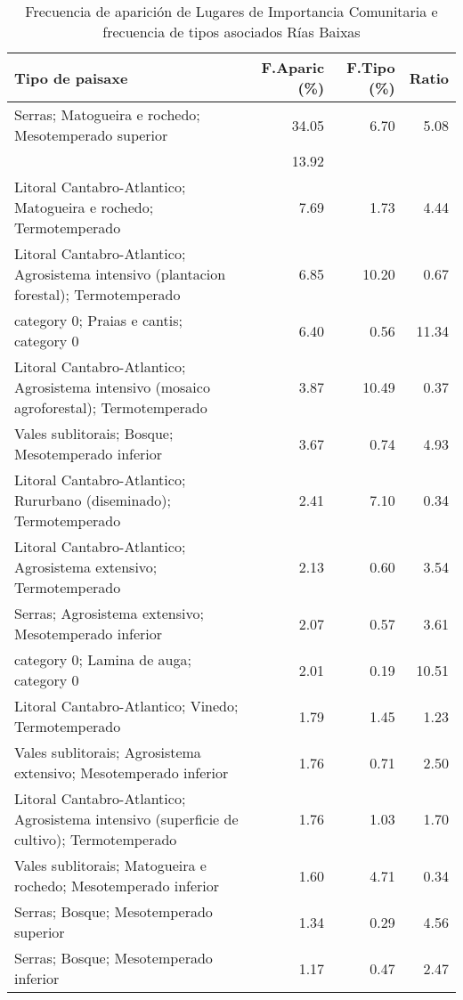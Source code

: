 \begin{table}[p]
\centering
\caption{Frecuencia de aparición de Lugares de Importancia Comunitaria e frecuencia de tipos asociados Rías Baixas} 
\label{vnatura12}
\begin{tabular}{lrrr}
  \hline
Tipo de paisaxe & F.Aparic (\%) & F.Tipo (\%) & Ratio \\ 
  \hline
Serras; Matogueira e rochedo; Mesotemperado superior & 34.05 & 6.70 & 5.08 \\ 
   & 13.92 &  &  \\ 
  Litoral Cantabro-Atlantico; Matogueira e rochedo; Termotemperado & 7.69 & 1.73 & 4.44 \\ 
  Litoral Cantabro-Atlantico; Agrosistema intensivo (plantacion forestal); Termotemperado & 6.85 & 10.20 & 0.67 \\ 
  category 0; Praias e cantis; category 0 & 6.40 & 0.56 & 11.34 \\ 
  Litoral Cantabro-Atlantico; Agrosistema intensivo (mosaico agroforestal); Termotemperado & 3.87 & 10.49 & 0.37 \\ 
  Vales sublitorais; Bosque; Mesotemperado inferior & 3.67 & 0.74 & 4.93 \\ 
  Litoral Cantabro-Atlantico; Rururbano (diseminado); Termotemperado & 2.41 & 7.10 & 0.34 \\ 
  Litoral Cantabro-Atlantico; Agrosistema extensivo; Termotemperado & 2.13 & 0.60 & 3.54 \\ 
  Serras; Agrosistema extensivo; Mesotemperado inferior & 2.07 & 0.57 & 3.61 \\ 
  category 0; Lamina de auga; category 0 & 2.01 & 0.19 & 10.51 \\ 
  Litoral Cantabro-Atlantico; Vinedo; Termotemperado & 1.79 & 1.45 & 1.23 \\ 
  Vales sublitorais; Agrosistema extensivo; Mesotemperado inferior & 1.76 & 0.71 & 2.50 \\ 
  Litoral Cantabro-Atlantico; Agrosistema intensivo (superficie de cultivo); Termotemperado & 1.76 & 1.03 & 1.70 \\ 
  Vales sublitorais; Matogueira e rochedo; Mesotemperado inferior & 1.60 & 4.71 & 0.34 \\ 
  Serras; Bosque; Mesotemperado superior & 1.34 & 0.29 & 4.56 \\ 
  Serras; Bosque; Mesotemperado inferior & 1.17 & 0.47 & 2.47 \\ 
   \hline
\end{tabular}
\end{table}
